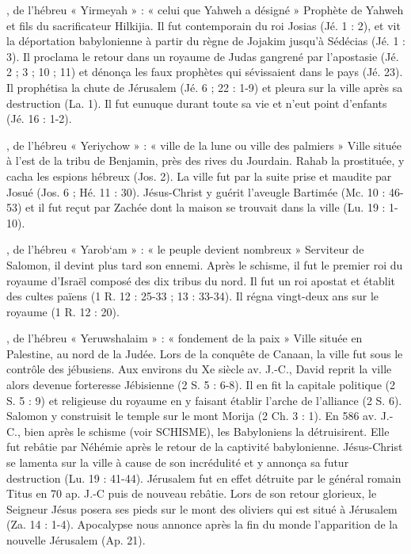 \begin{multicols}{2}
, de l'hébreu « Yirmeyah » : « celui que Yahweh a désigné »
Prophète de Yahweh et fils du sacrificateur Hilkijia. Il fut contemporain du roi Josias (Jé. 1 : 2), et vit la déportation babylonienne à partir du règne de Jojakim jusqu'à Sédécias (Jé. 1 : 3). Il proclama le retour dans un royaume de Judas gangrené par l'apostasie (Jé. 2 ; 3 ; 10 ; 11) et dénonça les faux prophètes qui sévissaient dans le pays (Jé. 23). Il prophétisa la chute de Jérusalem (Jé. 6 ; 22 : 1-9) et pleura sur la ville après sa destruction (La. 1). Il fut eunuque durant toute sa vie et n'eut point d'enfants (Jé. 16 : 1-2).


, de l'hébreu « Yeriychow » : « ville de la lune ou ville des palmiers »
Ville située à l'est de la tribu de Benjamin, près des rives du Jourdain.
Rahab la prostituée, y cacha les espions hébreux (Jos. 2). La ville fut par la suite prise et maudite par Josué (Jos. 6 ; Hé. 11 : 30). Jésus-Christ y guérit l'aveugle Bartimée (Mc. 10 : 46-53) et il fut reçut par Zachée dont la maison se trouvait dans la ville (Lu. 19 : 1-10).


, de l'hébreu « Yarob`am » : « le peuple devient nombreux »
Serviteur de Salomon, il devint plus tard son ennemi. Après le schisme, il fut le premier roi du royaume d'Israël composé des dix tribus du nord. Il fut un roi apostat et établit des cultes païens (1 R. 12 : 25-33 ; 13 : 33-34). Il régna vingt-deux ans sur le royaume (1 R. 12 : 20).


, de l'hébreu « Yeruwshalaim » : « fondement de la paix »
Ville située en Palestine, au nord de la Judée. Lors de la conquête de Canaan, la ville fut sous le contrôle des jébusiens. Aux environs du Xe siècle av. J.-C., David reprit la ville alors devenue forteresse Jébisienne (2 S. 5 : 6-8). Il en fit la capitale politique (2 S. 5 : 9) et religieuse du royaume en y faisant établir l'arche de l'alliance (2 S. 6). Salomon y construisit le temple sur le mont Morija (2 Ch. 3 : 1). En 586 av. J.-C., bien après le schisme (voir SCHISME), les Babyloniens la détruisirent. Elle fut rebâtie par Néhémie après le retour de la captivité babylonienne. Jésus-Christ se lamenta sur la ville à cause de son incrédulité et y annonça sa futur destruction (Lu. 19 : 41-44). Jérusalem fut en effet détruite par le général romain Titus en 70 ap. J.-C puis de nouveau rebâtie. Lors de son retour glorieux, le Seigneur Jésus posera ses pieds sur le mont des oliviers qui est situé à Jérusalem (Za. 14 : 1-4). Apocalypse nous annonce après la fin du monde l'apparition de la nouvelle Jérusalem (Ap. 21).



\end{multicols}
